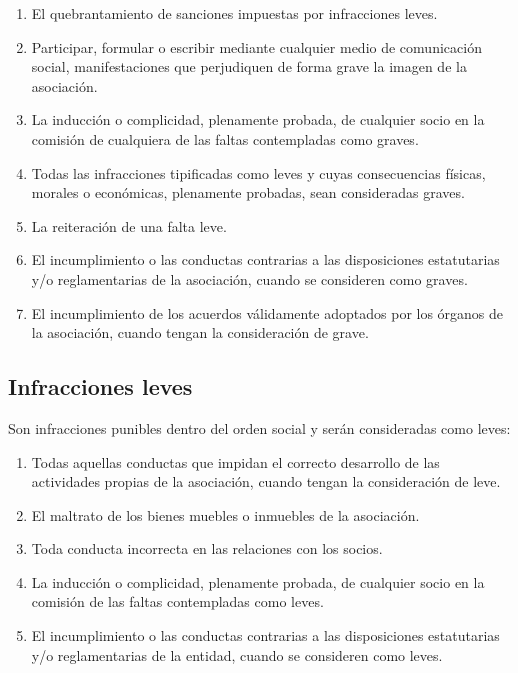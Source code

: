 \documentclass[a4paper, 12pt, oneside]{book}
\begin{document}
\begin{enumerate}
    \item El quebrantamiento de sanciones impuestas por infracciones leves.  
    \item Participar, formular o escribir mediante cualquier medio de comunicación social, manifestaciones que perjudiquen de forma grave la imagen de la asociación.  
    \item La inducción o complicidad, plenamente probada, de cualquier socio en la comisión de cualquiera de las faltas contempladas como graves.  
    \item Todas las infracciones tipificadas como leves y cuyas consecuencias físicas, morales o económicas, plenamente probadas, sean consideradas graves.  
    \item La reiteración de una falta leve.  
    \item El incumplimiento o las conductas contrarias a las disposiciones estatutarias y/o reglamentarias de la asociación, cuando se consideren como graves.  
    \item El incumplimiento de los acuerdos válidamente adoptados por los órganos de la asociación, cuando tengan la consideración de grave.
\end{enumerate}

\subsection{Infracciones leves}

Son infracciones punibles dentro del orden social y serán consideradas como leves:

\begin{enumerate}
    \item Todas aquellas conductas que impidan el correcto desarrollo de las actividades propias de la asociación, cuando tengan la consideración de leve.  
    \item El maltrato de los bienes muebles o inmuebles de la asociación.  
    \item Toda conducta incorrecta en las relaciones con los socios.  
    \item La inducción o complicidad, plenamente probada, de cualquier socio en la comisión de las faltas contempladas como leves.  
    \item El incumplimiento o las conductas contrarias a las disposiciones estatutarias y/o reglamentarias de la entidad, cuando se consideren como leves.
\end{enumerate}
\end{document}
